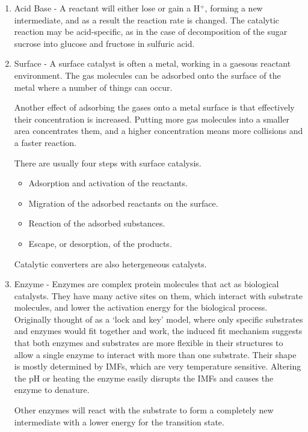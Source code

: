 \documentclass[../chem.tex]{subfiles}
\begin{document}
\begin{enumerate}
    \item Acid Base - A reactant will either lose or gain a H$^+$, forming a new intermediate, and as a result the reaction rate is changed. The catalytic reaction may be acid-specific, as in the case of decomposition of the sugar sucrose into glucose and fructose in sulfuric acid.
    \item Surface - A surface catalyst is often a metal, working in a gaesous reactant environment. The gas molecules can be adsorbed onto the surface of the metal where a number of things can occur.
    
    Another effect of adsorbing the gases onto a metal surface is that effectively their concentration is increased. Putting more gas molecules into a smaller area concentrates them, and a higher concentration means more collisions and a faster reaction.
    
    There are usually four steps with surface catalysis.
    \begin{itemize}
        \item Adsorption and activation of the reactants.
        \item Migration of the adsorbed reactants on the surface.
        \item Reaction of the adsorbed substances.
        \item Escape, or desorption, of the products.
    \end{itemize}

    Catalytic converters are also hetergeneous catalysts. 
    
    \item Enzyme - Enzymes are complex protein molecules that act as biological catalysts. They have many active sites on them, which interact with substrate molecules, and lower the activation energy for the biological process.
    Originally thought of as a `lock and key' model, where only specific substrates and enzymes would fit together and work, the induced fit mechanism suggests that both enzymes and substrates are more 
    flexible in their structures to allow a single enzyme to interact with more than one substrate. Their shape is mostly determined by IMFs, which are very temperature sensitive.
    Altering the pH or heating the enzyme easily disrupts the IMFs and causes the enzyme to denature.

    Other enzymes will react with the substrate to form a completely new intermediate with a lower energy for the transition state.
\end{enumerate}
\end{document}
